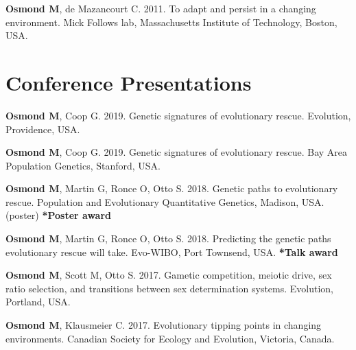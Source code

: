 \documentclass[12pt]{article}
\begin{document}

\textbf{Osmond M}, de Mazancourt C. 2011. To adapt and persist in a changing environment. Mick Follows lab, Massachusetts Institute of Technology, Boston, USA.

\newpage
\section*{Conference Presentations}

\textbf{Osmond M}, Coop G. 2019. Genetic signatures of evolutionary rescue. Evolution, Providence, USA.

\textbf{Osmond M}, Coop G. 2019. Genetic signatures of evolutionary rescue. Bay Area Population Genetics, Stanford, USA.

\textbf{Osmond M}, Martin G, Ronce O, Otto S. 2018. Genetic paths to evolutionary rescue. Population and Evolutionary Quantitative Genetics, Madison, USA. (poster) \textbf{*Poster award}


\textbf{Osmond M}, Martin G, Ronce O, Otto S. 2018. Predicting the genetic paths evolutionary rescue will take. Evo-WIBO, Port Townsend, USA. \textbf{*Talk award}


\textbf{Osmond M}, Scott M, Otto S. 2017. Gametic competition, meiotic drive, sex ratio selection, and transitions between sex determination systems. Evolution, Portland, USA. 

\textbf{Osmond M}, Klausmeier C. 2017. Evolutionary tipping points in changing environments. Canadian Society for Ecology and Evolution, Victoria, Canada. 

\end{document}
